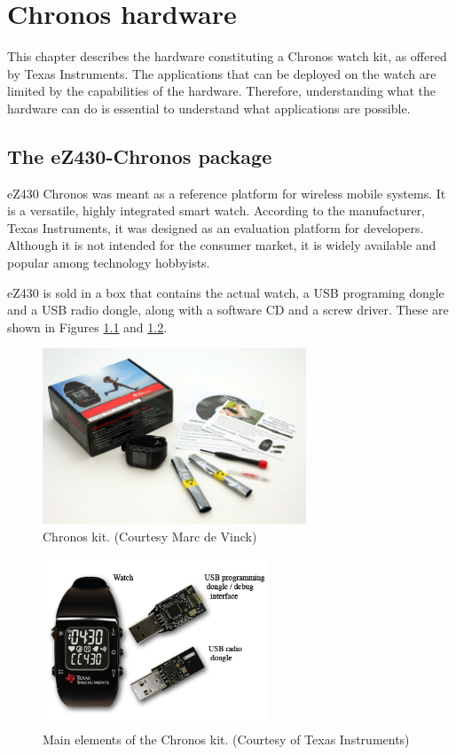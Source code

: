 \chapter{Chronos hardware}
\label{ch:chronos_hardware}

This chapter describes the hardware constituting a Chronos watch kit,
as offered by Texas Instruments. The applications that can be deployed
on the watch are limited by the capabilities of the hardware.
Therefore, understanding what the hardware can do is essential to
understand what applications are possible.

\section{The eZ430-Chronos package}

eZ430 Chronos was meant as a reference platform for wireless mobile
systems.  It is a versatile, highly integrated smart watch.  According
to the manufacturer, Texas Instruments, it was designed  as an
evaluation platform for developers.  Although it is not intended for
the consumer market, it is widely available and popular among
technology hobbyists.

eZ430 is sold in a box that contains the actual watch, a USB programing dongle
and a USB radio dongle, along with a software CD and a screw driver.
These are shown in Figures \ref{fig:chronos_kit} and
\ref{fig:chronos_watch}.

\begin{figure}[h]
  \centering
  \includegraphics[width=0.7\textwidth]{img/chronos_kit.jpg}
  \caption{Chronos kit. (Courtesy Marc de
  Vinck)}
  \label{fig:chronos_kit}
\end{figure}

\begin{figure}[h]
  \centering
  \includegraphics[width=0.6\textwidth]{img/chronos_watch.png}
  \caption{Main elements of the Chronos kit. (Courtesy of Texas
  Instruments)}
  \label{fig:chronos_watch}
\end{figure}

